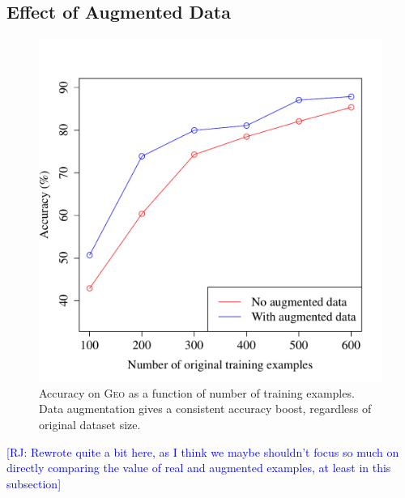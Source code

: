 \documentclass[11pt,letterpaper]{article}
\newcommand{\geo}{\textsc{Geo}\xspace}
\newcommand\rj[1]{\textcolor{blue}{[RJ: #1]}}
\begin{document}

\subsection{Effect of Augmented Data}
\begin{figure}[t] 
\small
\begin{center} 
  \includegraphics[scale=0.4]{fig-geo-augment.pdf}
\end{center} 
\caption{Accuracy on \geo as a function of number of training examples.
  Data augmentation gives a consistent accuracy boost,
regardless of original dataset size.}
\label{fig:geo-augment}
\end{figure}
\rj{Rewrote quite a bit here, as I think we maybe shouldn't
  focus so much on directly comparing the value of
real and augmented examples, at least in this subsection}
\end{document}
